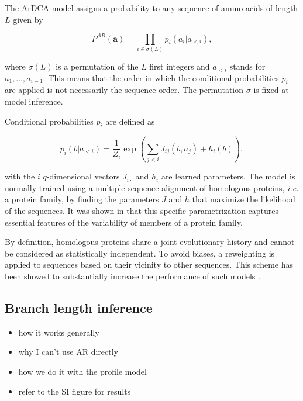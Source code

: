 The ArDCA model assigns a probability to any sequence of amino acids of length $L$ given by 

\begin{equation}
	\label{eq:autoregressive_def_methods}
	P^{AR}(\mathbf{a}) = \prod_{i \in \sigma(L)} p_i(a_i \vert a_{<i}),
\end{equation}

where $\sigma(L)$ is a permutation of the $L$ first integers and $a_{<i}$ stands for $a_1, \ldots, a_{i-1}$. 
This means that the order in which the conditional probabilities $p_i$ are applied is not necessarily the sequence order. 
The permutation $\sigma$ is fixed at model inference. 

Conditional probabilities $p_i$ are defined as

\begin{equation}
	p_i(b \vert a_{<i}) = \frac{1}{Z_i}\exp\left( \sum_{j < i} J_{ij}(b, a_j) + h_i(b) \right),
\end{equation}

with the $i$ $q$-dimensional vectors $J_{i\cdot}$ and $h_i$ are learned parameters. 
The model is normally trained using a multiple sequence alignment of homologous proteins, \emph{i.e.} a protein family, by finding the parameters $J$ and $h$ that maximize the likelihood of the sequences. 
It was shown in \cite{trinquier_efficientgenerativemodeling_2021} that this specific parametrization captures essential features of the variability of members of a protein family.

By definition, homologous proteins share a joint evolutionary history and cannot be considered as statistically independent. 
To avoid biases, a reweighting is applied to sequences based on their vicinity to other sequences. 
This scheme has been showed to substantially increase the performance of such models \cite{cocco_inversestatisticalphysics_2018}. 

\subsection{Branch length inference}

\begin{itemize}
	\item how it works generally
	\item why I can't use AR directly
	\item how we do it with the profile model
	\item refer to the SI figure for results
\end{itemize}

